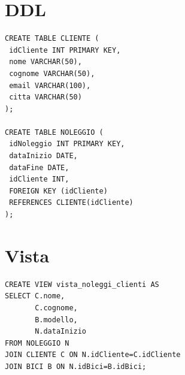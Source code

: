 \documentclass[a4paper,12pt]{article}
\begin{document}
\section*{DDL}

\begin{verbatim}
CREATE TABLE CLIENTE (
 idCliente INT PRIMARY KEY,
 nome VARCHAR(50),
 cognome VARCHAR(50),
 email VARCHAR(100),
 citta VARCHAR(50)
);

CREATE TABLE NOLEGGIO (
 idNoleggio INT PRIMARY KEY,
 dataInizio DATE,
 dataFine DATE,
 idCliente INT,
 FOREIGN KEY (idCliente)
 REFERENCES CLIENTE(idCliente)
);
\end{verbatim}

\section*{Vista}

\begin{verbatim}
CREATE VIEW vista_noleggi_clienti AS
SELECT C.nome,
       C.cognome,
       B.modello,
       N.dataInizio
FROM NOLEGGIO N
JOIN CLIENTE C ON N.idCliente=C.idCliente
JOIN BICI B ON N.idBici=B.idBici;
\end{verbatim}
\end{document}
